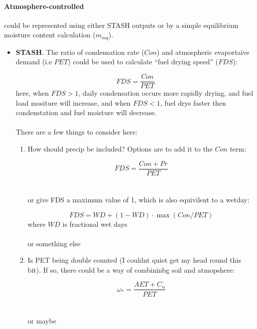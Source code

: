 \begin{shaded}
\paragraph{Atmosphere-controlled} could be represented using either STASH outputs or by a simple equilibrium moisture content calculation ($m_{mq}$).
\begin{itemize}

\item \textbf{STASH}. The ratio of condensation rate ($Con$) and atmospheric evaportaive demand (i.e $PET$) could be used to calculate ``fuel drying speed'' ($FDS$):

    \begin{equation}
        FDS = \frac{Con}{PET}
    \end{equation}
    here, when $FDS>1$, daily condensation occurs more rapidly drying, and fuel load mositure will increase, and when $FDS<1$, fuel drys faster then condenstation and fuel moisture will decrease. \\
    \\
    There are a few things to consider here:

    \begin{enumerate}
        \item How should precip be included? Options are to add it to the $Con$ term:

        \begin{equation}
            FDS = \frac{Con + Pr}{PET}
        \end{equation}
        \\
        \\
        or give FDS a maximum value of 1, which is also equivilent to a wetday:

        \begin{equation}
            FDS = WD + (1 - WD) \cdot \max(Con/PET)
        \end{equation}
        where $WD$ is fractional wet days
        \\
        \\
        or something else

        \item Is PET being double counted (I couldnt quiet get my head round this bit). If so, there could be a way of combininbg soil and atmopshere:

        \begin{equation}
            \omega_{*} = \frac{AET + C_n}{PET}
        \end{equation}
        \\
        \\
        or maybe


\end{enumerate}
\end{itemize}
\end{shaded}
